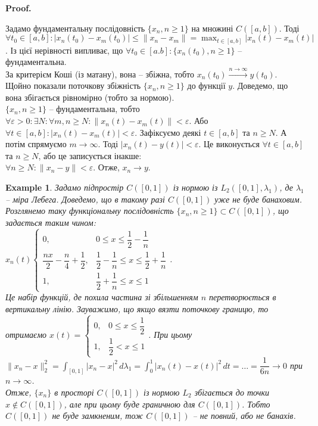 \documentclass[a4paper, 10pt]{article}
\makeatletter
\theoremstyle{theoremdd}
\theoremstyle{theoremdd}
\theoremstyle{theoremdd}
\theoremstyle{theoremdd}
\newtheorem{example}[theorem]{Example}
\theoremstyle{theoremdd}
\theoremstyle{theoremdd}
\theoremstyle{theoremdd}
\theoremstyle{theoremdd}
\renewenvironment{proof}[1][Proof.\\]{\par
\pushQED{\hfill \qed}%
\normalfont \topsep6\p@\@plus6\p@\relax
\trivlist
\item\relax
{\bfseries
#1\@addpunct{.}}\hspace\labelsep\ignorespaces
}{%
\popQED\endtrivlist\@endpefalse
}
\makeatother
\begin{document}
\begin{proof}
Задамо фундаментальну послідовність $\{x_n, n \geq 1\}$ на множині $C([a,b])$. Тоді \\ $\forall t_0 \in [a,b]: |x_n(t_0)-x_m(t_0)| \leq \|x_n-x_m\| = \displaystyle\max_{t \in [a,b]} |x_n(t)-x_m(t)|$. Із цієї нерівності випливає, що $\forall t_0 \in [a.b]: \{x_n(t_0), n \geq 1\}$ -- фундаментальна.\\
За критерієм Коші (із матану), вона -- збіжна, тобто $x_n(t_0) \overset{n \to \infty}{\to} y(t_0)$. Щойно показали поточкову збіжність $\{x_n, n \geq 1\}$ до функції $y$. Доведемо, що вона збігається рівномірно (тобто за нормою).\\
$\{x_n, n \geq 1\}$ -- фундаментальна, тобто $\forall \varepsilon > 0: \exists N: \forall m,n \geq N: \|x_n(t) - x_m(t)\| < \varepsilon$. Або $\forall t \in [a,b]: |x_n(t) - x_m(t)| < \varepsilon$. Зафіксуємо деякі $t \in [a,b]$ та $n \geq N$. А потім спрямуємо $m \to \infty$. Тоді $|x_n(t)-y(t)| < \varepsilon$. Це виконується $\forall t \in [a,b]$ та $n \geq N$, або це записується інакше:\\
$\forall n \geq N: \|x_n - y\| < \varepsilon$. Отже, $x_n \to y$.
\end{proof}

\begin{example}
Задамо підпростір $C([0,1])$ із нормою із $L_2([0,1],\lambda_1)$, де $\lambda_1$ -- міра Лебега. Доведемо, що в такому разі $C([0,1])$ уже не буде банаховим.\\
Розглянемо таку функціональну послідовність $\{x_n,n \geq 1\} \subset C([0,1])$, що задається таким чином:\\
$x_n(t) \begin{cases}
0, & 0 \leq x \leq \dfrac{1}{2} - \dfrac{1}{n} \\
\dfrac{nx}{2} - \dfrac{n}{4} + \dfrac{1}{2}, & \dfrac{1}{2} - \dfrac{1}{n} \leq x \leq \dfrac{1}{2} + \dfrac{1}{n} \\
1, & \dfrac{1}{2} + \dfrac{1}{n} \leq x \leq 1
\end{cases}$.\\
Це набір функцій, де похила частина зі збільшенням $n$ перетворюється в вертикальну лінію. Зауважимо, що якщо вязти поточкову границю, то отримаємо $x(t) = \begin{cases} 0, & 0 \leq x \leq \dfrac{1}{2} \\1, & \dfrac{1}{2} < x \leq 1 \end{cases}$. При цьому\\
$\|x_n - x\|_2^2 = \displaystyle\int_{[0,1]} |x_n-x|^2\,d\lambda_1 = \int_0^1 |x_n(t)-x(t)|^2\,dt = \dots = \dfrac{1}{6n} \to 0$ при $n \to \infty$.\\
Отже, $\{x_n\}$ в просторі $C([0,1])$ із нормою $L_2$ збігається до точки $x \notin C([0,1])$, але при цьому буде граничною для $C([0,1])$. Тобто $C([0,1])$ не буде замкненим, тож $C([0,1])$ -- не повний, або не банахів.
\end{example}
\end{document}
